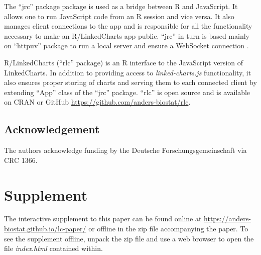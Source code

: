 \documentclass[twocolumn,10pt]{article}
\begin{document}
The ``jrc'' package \citep{jrc_2020} package is used as a bridge between R and JavaScript. It allows one to run JavaScript code from an R session and vice versa. It also manages client connections to the app and is responsible for all the functionality necessary to make an R/LinkedCharts app public. ``jrc'' in turn is based mainly on ``httpuv'' \citep{cheng_2020} package to run a local server and ensure a WebSocket connection \citep{fette_rfc_2011}. 

R/LinkedCharts (``rlc'' package) is an R \citep{R_2019} interface to the JavaScript version of LinkedCharts. In addition to providing access to \emph{linked-charts.js} functionality, it also ensures proper storing of charts and serving them to each connected client by extending ``App'' class of the ``jrc'' package. ``rlc'' is open source and is available on CRAN or GitHub \url{https://github.com/anders-biostat/rlc}.

\subsection{Acknowledgement}

The authors acknowledge funding by the Deutsche Forschungsgemeinschaft via CRC 1366.

\section{Supplement}

The interactive supplement to this paper can be found online at \url{https://anders-biostat.github.io/lc-paper/} or offline in the zip file accompanying the paper. To see the supplement offline, unpack the zip file and use a web browser to open the file \emph{index.html} contained within.


\begin{small} 

\end{small}
\end{document}
